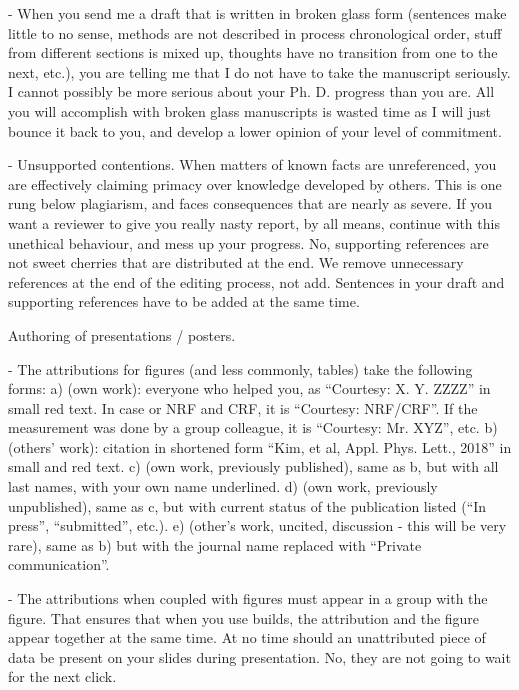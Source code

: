 \documentclass{article}
\begin{document}
- When you send me a draft that is written in broken glass form (sentences make little to no sense, methods are not described in process chronological order, stuff from different sections is mixed up, thoughts have no transition from one to the next, etc.), you are telling me that I do not have to take the manuscript seriously. I cannot possibly be more serious about your Ph. D. progress than you are. All you will accomplish with broken glass manuscripts is wasted time as I will just bounce it back to you, and develop a lower opinion of your level of commitment.

- Unsupported contentions. When matters of known facts are unreferenced, you are effectively claiming primacy over knowledge developed by others. This is one rung below plagiarism, and faces consequences that are nearly as severe. If you want a reviewer to give you really nasty report, by all means, continue with this unethical behaviour, and mess up your progress. No, supporting references are not sweet cherries that are distributed at the end. We remove unnecessary references at the end of the editing process, not add. Sentences in your draft and supporting references have to be added at the same time.

Authoring of presentations / posters.

- The attributions for figures (and less commonly, tables) take the following forms:
	a) (own work): everyone who helped you, as “Courtesy: X. Y. ZZZZ” in small red text. In case or NRF and CRF, it is “Courtesy: NRF/CRF”. If the measurement was done by a group colleague, it is “Courtesy: Mr. XYZ”, etc.
	b) (others’ work): citation in shortened form “Kim, et al, Appl. Phys. Lett., 2018” in small and red text.
	c) (own work, previously published), same as b, but with all last names, with your own name underlined.
	d) (own work, previously unpublished), same as c, but with current status of the publication listed (“In press”, “submitted”, etc.).
	e) (other’s work, uncited, discussion - this will be very rare), same as b) but with the journal name replaced with “Private communication”.

- The attributions when coupled with figures must appear in a group with the figure. That ensures that when you use builds, the attribution and the figure appear together at the same time. At no time should an unattributed piece of data be present on your slides during presentation. No, they are not going to wait for the next click.
\end{document}
